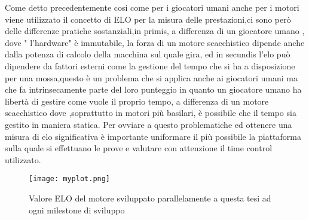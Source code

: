 Come detto precedentemente cosi come per i giocatori umani anche per i motori viene utilizzato il concetto di ELO per la misura delle prestazioni,ci sono però delle differenze pratiche sostanziali,in primis,
a differenza di un giocatore umano , dove " l'hardware" è immutabile, la forza di un motore scacchistico dipende anche dalla potenza di calcolo della macchina sul quale gira, ed in secundis l'elo può dipendere 
da fattori esterni come la gestione del tempo che si ha a disposizione per una mossa,questo è un problema che si applica anche ai giocatori umani ma che fa intrinsecamente parte del loro punteggio in quanto 
un giocatore umano ha libertà di gestire come vuole il proprio tempo, a differenza di un motore scacchistico dove ,soprattutto in motori più basilari, è possibile che il tempo sia gestito in maniera statica.
Per ovviare a questo problematiche ed ottenere una misura di elo significativa è importante uniformare il più possibile la piattaforma sulla quale si effettuano le prove e valutare con attenzione il time control utilizzato.

\begin{figure}[h]
    \centering
    \texttt{[image: myplot.png]}
    \caption{Valore ELO del motore sviluppato parallelamente a questa tesi ad ogni milestone di sviluppo}
\end{figure}

